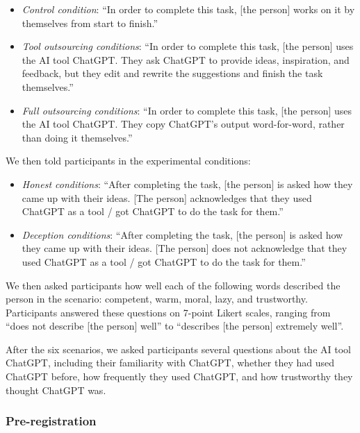 \documentclass[
  man,
  floatsintext,
  longtable,
  nolmodern,
  notxfonts,
  notimes,
  colorlinks=true,linkcolor=blue,citecolor=blue,urlcolor=blue]{apa7}
\providecommand{\tightlist}{%
  \setlength{\itemsep}{0pt}\setlength{\parskip}{0pt}}
\begin{document}
\begin{itemize}
\tightlist
\item
  \emph{Control condition}: ``In order to complete this task, {[}the
  person{]} works on it by themselves from start to finish.''
\item
  \emph{Tool outsourcing conditions}: ``In order to complete this task,
  {[}the person{]} uses the AI tool ChatGPT. They ask ChatGPT to provide
  ideas, inspiration, and feedback, but they edit and rewrite the
  suggestions and finish the task themselves.''
\item
  \emph{Full outsourcing conditions}: ``In order to complete this task,
  {[}the person{]} uses the AI tool ChatGPT. They copy ChatGPT's output
  word-for-word, rather than doing it themselves.''
\end{itemize}

We then told participants in the experimental conditions:

\begin{itemize}
\tightlist
\item
  \emph{Honest conditions}: ``After completing the task, {[}the
  person{]} is asked how they came up with their ideas. {[}The person{]}
  acknowledges that they used ChatGPT as a tool / got ChatGPT to do the
  task for them.''
\item
  \emph{Deception conditions}: ``After completing the task, {[}the
  person{]} is asked how they came up with their ideas. {[}The person{]}
  does not acknowledge that they used ChatGPT as a tool / got ChatGPT to
  do the task for them.''
\end{itemize}

We then asked participants how well each of the following words
described the person in the scenario: competent, warm, moral, lazy, and
trustworthy. Participants answered these questions on 7-point Likert
scales, ranging from ``does not describe {[}the person{]} well'' to
``describes {[}the person{]} extremely well''.

After the six scenarios, we asked participants several questions about
the AI tool ChatGPT, including their familiarity with ChatGPT, whether
they had used ChatGPT before, how frequently they used ChatGPT, and how
trustworthy they thought ChatGPT was.

\subsubsection*{Pre-registration}\label{pre-registration}
\end{document}
